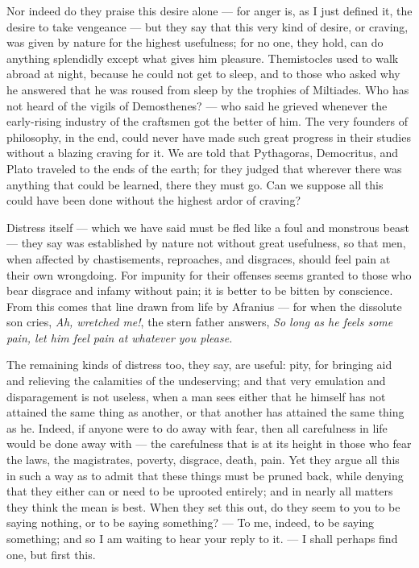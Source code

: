  Nor indeed do they praise this desire alone — for anger is, as I just defined it, the desire to take vengeance — but they say that this very kind of desire, or craving, was given by nature for the highest usefulness; for no one, they hold, can do anything splendidly except what gives him pleasure. Themistocles used to walk abroad at night, because he could not get to sleep, and to those who asked why he answered that he was roused from sleep by the trophies of Miltiades. Who has not heard of the vigils of Demosthenes? — who said he grieved whenever the early-rising industry of the craftsmen got the better of him. The very founders of philosophy, in the end, could never have made such great progress in their studies without a blazing craving for it. We are told that Pythagoras, Democritus, and Plato traveled to the ends of the earth; for they judged that wherever there was anything that could be learned, there they must go. Can we suppose all this could have been done without the highest ardor of craving?

 Distress itself — which we have said must be fled like a foul and monstrous beast — they say was established by nature not without great usefulness, so that men, when affected by chastisements, reproaches, and disgraces, should feel pain at their own wrongdoing. For impunity for their offenses seems granted to those who bear disgrace and infamy without pain; it is better to be bitten by conscience. From this comes that line drawn from life by Afranius — for when the dissolute son cries, \textit{Ah, wretched me!}, the stern father answers, \textit{So long as he feels some pain, let him feel pain at whatever you please.}

 The remaining kinds of distress too, they say, are useful: pity, for bringing aid and relieving the calamities of the undeserving; and that very emulation and disparagement is not useless, when a man sees either that he himself has not attained the same thing as another, or that another has attained the same thing as he. Indeed, if anyone were to do away with fear, then all carefulness in life would be done away with — the carefulness that is at its height in those who fear the laws, the magistrates, poverty, disgrace, death, pain. Yet they argue all this in such a way as to admit that these things must be pruned back, while denying that they either can or need to be uprooted entirely; and in nearly all matters they think the mean is best. When they set this out, do they seem to you to be saying nothing, or to be saying something? — To me, indeed, to be saying something; and so I am waiting to hear your reply to it. — I shall perhaps find one, but first this.

